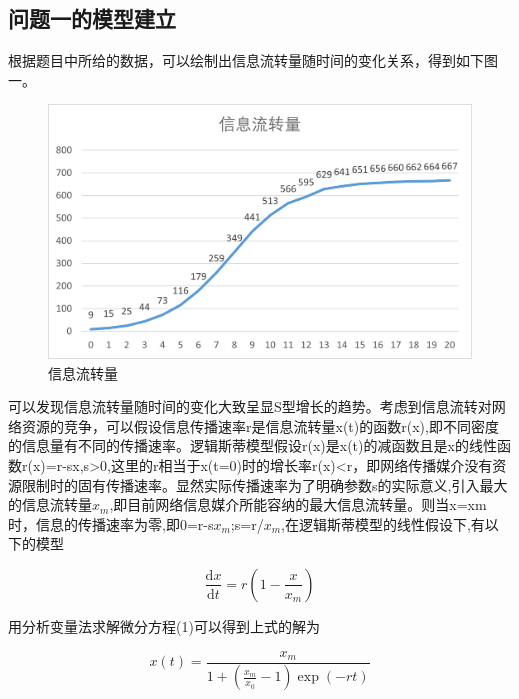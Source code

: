 \documentclass[UTF8]{ctexart}
\begin{document}
\subsection{问题一的模型建立}
根据题目中所给的数据，可以绘制出信息流转量随时间的变化关系，得到如下图一。\par 
\begin{figure}[h]
	\centering
	\includegraphics[scale=1]{信息流转量.png}
	\caption{信息流转量}
\end{figure}\par 
可以发现信息流转量随时间的变化大致呈显S型增长的趋势。考虑到信息流转对网络资源的竞争，可以假设信息传播速率r是信息流转量x(t)的函数r(x),即不同密度的信息量有不同的传播速率。逻辑斯蒂模型假设r(x)是x(t)的减函数且是x的线性函数r(x)=r-sx,s>0,这里的r相当于x(t=0)时的增长率r(x)<r，即网络传播媒介没有资源限制时的固有传播速率。显然实际传播速率为了明确参数s的实际意义,引入最大的信息流转量$x_m$,即目前网络信息媒介所能容纳的最大信息流转量。则当x=xm时，信息的传播速率为零,即0=r-s$x_m$;s=r/$x_m$,在逻辑斯蒂模型的线性假设下,有以下的模型\par
\begin{equation}
\frac{\mathrm{d}x}{\mathrm{d}t}=r\left( 1-\frac{x}{x_m} \right) 
\end{equation}\par
用分析变量法求解微分方程(1)可以得到上式的解为\par
\begin{equation}
x\left( t \right) =\frac{x_m}{1+\left( \frac{x_m}{x_0}-1 \right) \exp \left( -rt \right)}
\end{equation}\par
\end{document}
